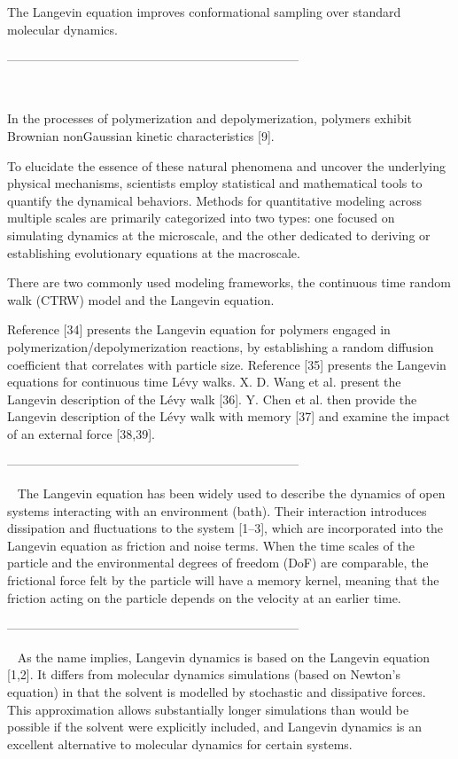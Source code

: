 \documentclass[../../main-notes.tex]{subfiles}
\begin{document}
{The Langevin equation improves conformational sampling over standard molecular dynamics.

-----------------------------------------------------------------------

~\citep{wangMultiscaleModelingSimulation2025}


In the processes of polymerization and depolymerization, polymers exhibit Brownian nonGaussian kinetic characteristics [9].

To elucidate the essence of these natural phenomena and uncover the underlying physical mechanisms, scientists employ statistical and mathematical tools to quantify the dynamical behaviors. Methods for quantitative modeling across multiple scales are primarily categorized into two types: one focused on simulating dynamics at the microscale, and the other dedicated to deriving or establishing evolutionary equations at the macroscale.

There are two commonly used modeling frameworks, the continuous time random walk (CTRW) model and the Langevin equation.

Reference [34] presents the Langevin equation for polymers engaged in polymerization/depolymerization reactions, by establishing a random diffusion coefficient that correlates with particle size. Reference [35] presents the Langevin equations for continuous time Lévy walks. X. D. Wang et al. present the Langevin description of the Lévy walk [36]. Y. Chen et al. then provide the Langevin description of the Lévy walk with memory [37] and examine the impact of an external force [38,39].

-----------------------------------------------------------------------

~\citep{luSemiclassicalGeneralizedLangevin2019}
The Langevin equation has been widely used to describe the dynamics of open systems interacting with an environment (bath). Their interaction introduces dissipation and fluctuations to the system [1–3], which are incorporated into the Langevin equation as friction and noise terms. When the time scales of the particle and the environmental degrees of freedom (DoF) are comparable, the frictional force felt by the particle will have a memory kernel, meaning that the friction acting on the particle depends on the velocity at an earlier time.

-----------------------------------------------------------------------

~\citep{pastorTechniquesApplicationsLangevin1994}
As the name implies, Langevin dynamics is based on the Langevin equation [1,2]. It differs from molecular dynamics simulations (based on Newton's equation) in that the solvent is modelled by stochastic and dissipative forces. This approximation allows substantially longer simulations than would be possible if the solvent were explicitly included, and Langevin dynamics is an excellent alternative to molecular dynamics for certain systems.

}
\end{document}
